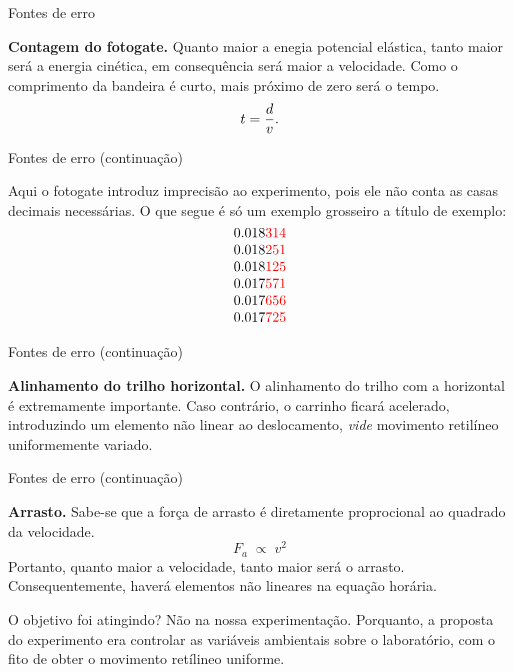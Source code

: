 \documentclass[
  leqno,
  aspectratio=169
]{beamer}
\begin{document}
  \begin{frame}{Fontes de erro}

    {\bf Contagem do fotogate.} Quanto maior a enegia potencial el\'astica, tanto maior ser\'a a energia cin\'etica, em consequ\^encia ser\'a maior a velocidade. Como o comprimento da bandeira \'e curto, mais pr\'oximo de zero ser\'a o tempo.
    \[
      t={d\over v}.
    \]
  \end{frame}
  \begin{frame}{Fontes de erro (continua\c c\~ao)}

    Aqui o fotogate introduz imprecis\~ao ao experimento, pois ele n\~ao conta as casas decimais necess\'arias. O que segue \'e s\'o um exemplo grosseiro a t\'itulo de exemplo:
    \vfil
    $$
      \vbox{
        \hbox{0.018\color{red}{314}}
        \hbox{0.018\color{red}{251}}
        \hbox{0.018\color{red}{125}}
        \hbox{0.017\color{red}{571}}
        \hbox{0.017\color{red}{656}}
        \hbox{0.017\color{red}{725}}
      }
    $$
    \vfil
  \end{frame}

  \begin{frame}{Fontes de erro (continua\c c\~ao)}

    {\bf Alinhamento do trilho horizontal.} O alinhamento do trilho com a horizontal \'e extremamente importante. Caso contr\'ario, o carrinho ficará acelerado, introduzindo um elemento n\~ao linear ao deslocamento, {\it vide} movimento retil\'ineo uniformemente variado. 

  \end{frame}


  \begin{frame}{Fontes de erro (continua\c c\~ao)}
    
    {\bf Arrasto.} Sabe-se que a for\c ca de arrasto \'e diretamente proprocional ao quadrado da velocidade.
    \[
      F_a\;\propto\;v^2
    \]
    Portanto, quanto maior a velocidade, tanto maior ser\'a o arrasto. Consequentemente, haver\'a elementos n\~ao lineares na equa\c c\~ao hor\'aria.
  
  \end{frame}

  \begin{frame}{O objetivo foi atingindo?}
    N\~ao na nossa experimenta\c c\~ao. Porquanto, a proposta do experimento era controlar as vari\'aveis ambientais sobre o laborat\'orio, com o fito de obter o movimento ret\'ilineo uniforme.
  \end{frame}
  
\end{document}
